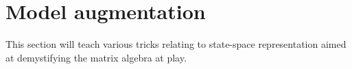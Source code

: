 \section{Model augmentation}

This section will teach various tricks relating to state-space representation
aimed at demystifying the matrix algebra at play.
